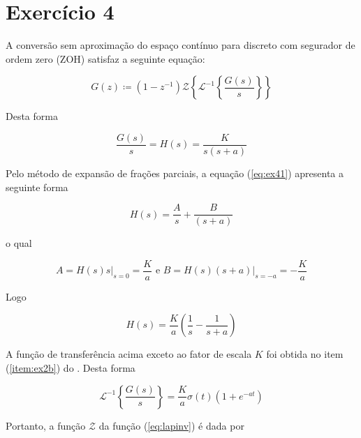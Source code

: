 \section*{Exercício 4}
\label{ex:4}

    A conversão sem aproximação do espaço contínuo para discreto com segurador de ordem zero (ZOH) satisfaz a seguinte equação:
    
        \begin{equation}
            G(z) \coloneqq (1-z^{-1}) \mathcal{Z}\left\{\mathcal{L}^{-1}\left\{\frac{G(s)}{s}\right\}\right\}
        \end{equation}
    
    Desta forma
    
        \begin{equation}
            \frac{G(s)}{s} = H(s) = \frac{K}{s(s+a)}
            \label{eq:ex41}
        \end{equation}
    
    Pelo método de expansão de frações parciais, a equação (\ref{eq:ex41}) apresenta a seguinte forma
    
        \begin{equation}
            H(s) = \frac{A}{s} + \frac{B}{(s+a)} 
        \end{equation}
    
    o qual 
    
        \begin{equation}
            A = H(s) s \bigg\rvert_{s=0} = \frac{K}{a} \mbox{ e } B = H(s) (s+a)\bigg\rvert_{s=-a} = -\frac{K}{a}
        \end{equation}
    
    Logo
    
        \begin{equation}
            H(s) = \frac{K}{a} \left( \frac{1}{s} - \frac{1}{s+a} \right)
        \end{equation}
    
    A função de transferência acima exceto ao fator de escala $K$ foi obtida no item (\ref{item:ex2b}) do . Desta forma
    
        \begin{equation}
            \mathcal{L}^{-1}\left\{\frac{G(s)}{s}\right\} = \frac{K}{a}\sigma(t)\left(1+e^{-at}\right)
            \label{eq:lapinv}
        \end{equation}
    
    Portanto, a função $\mathcal{Z}$ da função (\ref{eq:lapinv}) é dada por
    
